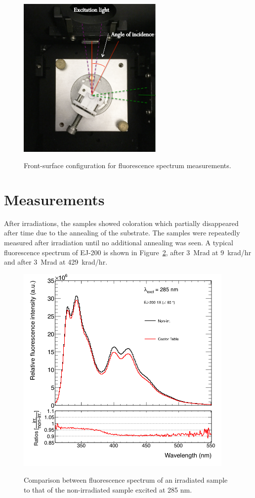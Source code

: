 \documentclass[preprint]{elsarticle}
\begin{document}


\begin{figure}[!ht]
	\centering
	\caption{Front-surface configuration for fluorescence spectrum measurements.}
	\includegraphics[width=200pt]{./figures/sample_placement.png}
	\label{fig:sample_placement}
\end{figure}

\section{Measurements} 
After irradiations, the samples showed coloration which partially disappeared after time due to the annealing of the substrate. 
The samples were repeatedly measured after irradiation until no additional annealing was seen. 
A typical fluorescence spectrum of EJ-200 is shown in Figure~\ref{fig:EJ200SP-1P-exc285}, 
after 3~Mrad at 9~krad/hr and after 3~Mrad at 429~krad/hr.

\begin{figure}[!htb]
	\centering
	\caption{Comparison between fluorescence spectrum of an irradiated sample to that of the non-irradiated sample excited at 285 nm.}
	\includegraphics[width=300pt]{./figures/EJ200-1X-exc285.png}
	\label{fig:EJ200SP-1P-exc285}
\end{figure}
\end{document}
